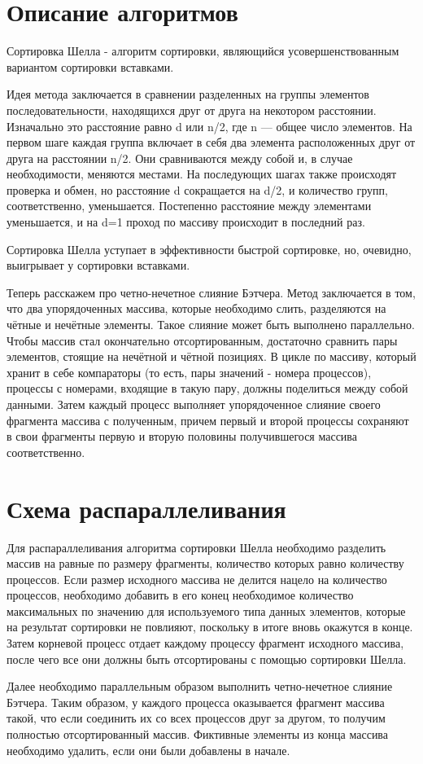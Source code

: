 \documentclass{report}
\begin{document}
\section*{Описание алгоритмов}
Сортировка Шелла - алгоритм сортировки, являющийся усовершенствованным вариантом сортировки вставками.
\par Идея метода заключается в сравнении разделенных на группы элементов последовательности, находящихся друг от друга на некотором расстоянии. Изначально это расстояние равно d или n/2, где n — общее число элементов. На первом шаге каждая группа включает в себя два элемента расположенных друг от друга на расстоянии n/2. Они сравниваются между собой и, в случае необходимости, меняются местами. На последующих шагах также происходят проверка и обмен, но расстояние d сокращается на d/2, и количество групп, соответственно, уменьшается. Постепенно расстояние между элементами уменьшается, и на d=1 проход по массиву происходит в последний раз.
\par Сортировка Шелла уступает в эффективности быстрой сортировке, но, очевидно, выигрывает у сортировки вставками.
\par Теперь расскажем про четно-нечетное слияние Бэтчера. Метод заключается в том, что два упорядоченных массива, которые необходимо слить, разделяются на чётные и нечётные элементы. Такое слияние может быть выполнено параллельно. Чтобы массив стал окончательно отсортированным, достаточно сравнить пары элементов, стоящие на нечётной и чётной позициях. В цикле по массиву, который хранит в себе компараторы (то есть, пары значений - номера процессов), процессы с номерами, входящие в такую пару, должны поделиться между собой данными. Затем каждый процесс выполняет упорядоченное слияние своего фрагмента массива с полученным, причем первый и второй процессы сохраняют в свои фрагменты первую и вторую половины получившегося массива соответственно.
\newpage

\section*{Схема распараллеливания}
Для распараллеливания алгоритма сортировки Шелла необходимо разделить массив на равные по размеру фрагменты, количество которых равно количеству процессов. Если размер исходного массива не делится нацело на количество процессов, необходимо добавить в его конец необходимое количество максимальных по значению для используемого типа данных элементов, которые на результат сортировки не повлияют, поскольку в итоге вновь окажутся в конце. Затем корневой процесс отдает каждому процессу фрагмент исходного массива, после чего все они должны быть отсортированы с помощью сортировки Шелла.
\par Далее необходимо параллельным образом выполнить четно-нечетное слияние Бэтчера. Таким образом, у каждого процесса оказывается фрагмент массива такой, что если соединить их со всех процессов друг за другом, то получим полностью отсортированный массив. Фиктивные элементы из конца массива необходимо удалить, если они были добавлены в начале.
\newpage
\end{document}
